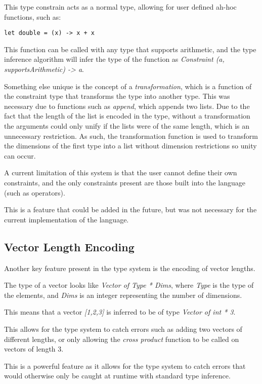 This type constrain acts as a normal type, allowing for user defined ah-hoc functions, such as:

\begin{verbatim}
let double = (x) -> x + x
\end{verbatim}

This function can be called with any type that supports arithmetic, and the type inference algorithm will infer the
type of the function as \textit{Constraint (a, supportsArithmetic) -> a}.

Something else unique is the concept of a \textit{transformation}, which is a function of the constraint type that
transforms the type into another type.
This was necessary due to functions such as \textit{append}, which appends two lists.
Due to the fact that the length of the list is encoded in the type, without a transformation the arguments could 
only unify if the lists were of the same length, which is an unnecessary restriction.
As such, the transformation function is used to transform the dimensions of the first type into a list without 
dimension restrictions so unity can occur.

A current limitation of this system is that the user cannot define their own constraints, and the only constraints 
present are those built into the language (such as operators).

This is a feature that could be added in the future, but was not necessary for the current implementation of the
language.

\subsection{Vector Length Encoding}\label{subsec:vector-length-enc}

Another key feature present in the type system is the encoding of vector lengths.

The type of a vector looks like \textit{Vector of Type * Dims}, where \textit{Type} is the type of the elements, and \textit{Dims} is an integer representing the number of dimensions.

This means that a vector \textit{[1,2,3]} is inferred to be of type \textit{Vector of int * 3}.

This allows for the type system to catch errors such as adding two vectors of different lengths, or only allowing the \textit{cross product} 
function to be called on vectors of length 3.

This is a powerful feature as it allows for the type system to catch errors that would otherwise only be caught at 
runtime with standard type inference.

